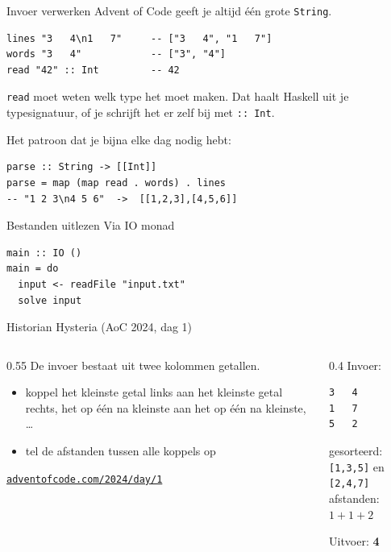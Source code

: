 \documentclass[aspectratio=169,11pt]{beamer}
\newcommand{\hs}{\lstinline[style=hsinline]}
\begin{document}
\begin{frame}[fragile]{Invoer verwerken}
  Advent of Code geeft je altijd één grote \hs|String|.
\begin{lstlisting}
lines "3   4\n1   7"     -- ["3   4", "1   7"]
words "3   4"            -- ["3", "4"]
read "42" :: Int         -- 42
\end{lstlisting}
  \pause
  \hs|read| moet weten \alert{welk type} het moet maken. Dat haalt Haskell
  uit je typesignatuur, of je schrijft het er zelf bij met \hs|:: Int|.
  \pause
  \medskip

  Het patroon dat je bijna elke dag nodig hebt:
\begin{lstlisting}
parse :: String -> [[Int]]
parse = map (map read . words) . lines
-- "1 2 3\n4 5 6"  ->  [[1,2,3],[4,5,6]]
\end{lstlisting}
\end{frame}


\begin{frame}[fragile]{Bestanden uitlezen}
Via IO monad
\begin{lstlisting}
main :: IO ()
main = do
  input <- readFile "input.txt"
  solve input
\end{lstlisting}
\end{frame}


\begin{frame}[fragile]{Historian Hysteria (AoC 2024, dag 1)}
  \begin{columns}[T,onlytextwidth]
    \begin{column}{0.55\textwidth}
      De invoer bestaat uit twee kolommen getallen.
      \begin{itemize}
        \item koppel het \alert{kleinste} getal links aan het kleinste getal rechts,
          het op één na kleinste aan het op één na kleinste, \ldots
        \item tel de afstanden tussen alle koppels op
      \end{itemize}
      \medskip
      \href{https://adventofcode.com/2024/day/1}{\texttt{adventofcode.com/2024/day/1}}
    \end{column}
    \begin{column}{0.4\textwidth}
      Invoer:
\begin{lstlisting}
3   4
1   7
5   2
\end{lstlisting}
      \pause
      {\small
      gesorteerd: \hs|[1,3,5]| en \hs|[2,4,7]|\\
      afstanden: \(1 + 1 + 2\)\par}
      \medskip
      Uitvoer: \alert{\textbf{4}}
    \end{column}
  \end{columns}
\end{frame}
\end{document}
